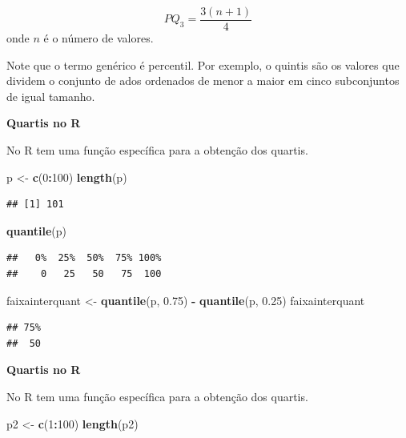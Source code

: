 \documentclass[
]{book}
\newenvironment{Shaded}{\begin{snugshade}}{\end{snugshade}}
\newcommand{\DecValTok}[1]{\textcolor[rgb]{0.00,0.00,0.81}{#1}}
\newcommand{\FloatTok}[1]{\textcolor[rgb]{0.00,0.00,0.81}{#1}}
\newcommand{\KeywordTok}[1]{\textcolor[rgb]{0.13,0.29,0.53}{\textbf{#1}}}
\newcommand{\NormalTok}[1]{#1}
\newcommand{\OperatorTok}[1]{\textcolor[rgb]{0.81,0.36,0.00}{\textbf{#1}}}
\newcommand{\StringTok}[1]{\textcolor[rgb]{0.31,0.60,0.02}{#1}}
\begin{document}
\begin{equation}
  PQ_3 = \dfrac{3(n +1)}{4}
  \label{eq:posicaoquartiltres}
\end{equation}
onde \(n\) é o número de valores.

Note que o termo genérico é percentil. Por exemplo, o quintis são os valores que dividem o conjunto de ados ordenados de menor a maior em cinco subconjuntos de igual tamanho.

\textbf{Quartis no R}

No R tem uma função específica para a obtenção dos quartis.

\begin{Shaded}
\begin{Highlighting}[]
\NormalTok{p <-}\StringTok{ }\KeywordTok{c}\NormalTok{(}\DecValTok{0}\OperatorTok{:}\DecValTok{100}\NormalTok{)}
\KeywordTok{length}\NormalTok{(p)}
\end{Highlighting}
\end{Shaded}

\begin{verbatim}
## [1] 101
\end{verbatim}

\begin{Shaded}
\begin{Highlighting}[]
\KeywordTok{quantile}\NormalTok{(p)}
\end{Highlighting}
\end{Shaded}

\begin{verbatim}
##   0%  25%  50%  75% 100% 
##    0   25   50   75  100
\end{verbatim}

\begin{Shaded}
\begin{Highlighting}[]
\NormalTok{faixainterquant <-}\StringTok{ }\KeywordTok{quantile}\NormalTok{(p, }\FloatTok{0.75}\NormalTok{) }\OperatorTok{-}\StringTok{ }\KeywordTok{quantile}\NormalTok{(p, }
    \FloatTok{0.25}\NormalTok{)}
\NormalTok{faixainterquant}
\end{Highlighting}
\end{Shaded}

\begin{verbatim}
## 75% 
##  50
\end{verbatim}

\textbf{Quartis no R}

No R tem uma função específica para a obtenção dos quartis.

\begin{Shaded}
\begin{Highlighting}[]
\NormalTok{p2 <-}\StringTok{ }\KeywordTok{c}\NormalTok{(}\DecValTok{1}\OperatorTok{:}\DecValTok{100}\NormalTok{)}
\KeywordTok{length}\NormalTok{(p2)}
\end{Highlighting}
\end{Shaded}
\end{document}
